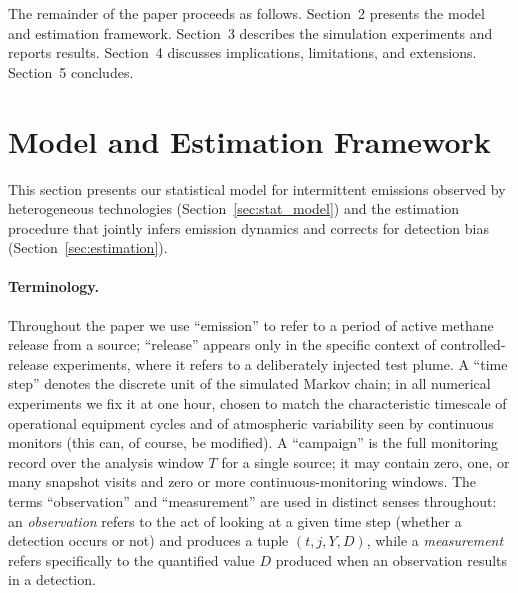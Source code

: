 \documentclass[numsec,webpdf,modern,mediumone]{oup-authoring-template}
\newcommand{\new}[1]{#1}
\begin{document}
The remainder of the paper proceeds as follows. Section~2 presents the model and estimation framework. Section~3 describes the simulation experiments and reports results. Section~4 discusses implications, limitations, and extensions. Section~5 concludes.


\newpage
\section{Model and Estimation Framework}
\label{sec:methods}

This section presents our statistical model for intermittent emissions observed by heterogeneous technologies (Section~\ref{sec:stat_model}) and the estimation procedure that jointly infers emission dynamics and corrects for detection bias (Section~\ref{sec:estimation}).

\new{\paragraph{Terminology.}
Throughout the paper we use ``emission'' to refer to a period of active methane release from a source; ``release'' appears only in the specific context of controlled-release experiments, where it refers to a deliberately injected test plume. A ``time step'' denotes the discrete unit of the simulated Markov chain; in all numerical experiments we fix it at one hour, chosen to match the characteristic timescale of operational equipment cycles and of atmospheric variability seen by continuous monitors (this can, of course, be modified). A ``campaign'' is the full monitoring record over the analysis window $T$ for a single source; it may contain zero, one, or many snapshot visits and zero or more continuous-monitoring windows. The terms ``observation'' and ``measurement'' are used in distinct senses throughout: an \emph{observation} refers to the act of looking at a given time step (whether a detection occurs or not) and produces a tuple $(t, j, Y, D)$, while a \emph{measurement} refers specifically to the quantified value $D$ produced when an observation results in a detection.}
\end{document}
